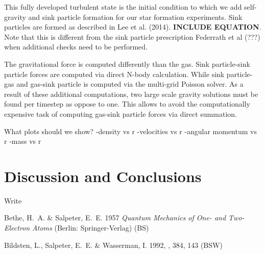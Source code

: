 \documentclass{emulateapj}
\begin{document}
This fully developed turbulent state is the initial condition to which we add self-gravity and sink particle formation for
our star formation experiments. Sink particles are formed as described in Lee et al. (2014). {\bf INCLUDE EQUATION}.  Note that this is different from the sink particle prescription Federrath et al (???) when additional checks need to be performed.

The gravitational force is computed differently than the gas. Sink particle-sink particle forces are computed via direct N-body calculation. While sink particle-gas and gas-sink particle is computed via the multi-grid Poisson solver.  As a result of these additional computations, two large scale gravity solutions must be found per timestep as oppose to one.  This allows to avoid the computationally expensive task of computing gas-sink particle forces via direct summation. 


What plots should we show?
-density vs r
-velocities vs r
-angular momentum vs r
-mass vs r

\begin{figure}
\end{figure}

\begin{figure*}
\end{figure*}

\begin{figure}
\end{figure}

\begin{figure}
\end{figure}

\section{Discussion and Conclusions}

\acknowledgments

Write

\begin{references}

\noindent
Bethe, H.~A. \& Salpeter, E.~E. 1957 \textit{Quantum Mechanics of One-
  and Two-Electron Atoms} (Berlin: Springer-Verlag) (BS) 

\noindent
Bildsten, L., Salpeter, E.~E. \& Wasserman, I. 1992, \apj, 384, 143
(BSW) 


\end{references}
\end{document}
